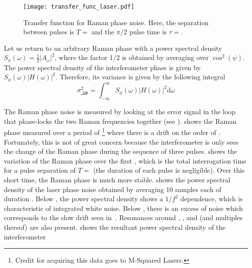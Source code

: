 \begin{figure}[htpb!]
  \centering
  \texttt{[image: transfer\_func\_laser.pdf]}
  \caption[Transfer function for Raman phase noise.]{Transfer function
  for Raman phase noise. Here, the separation between pulses is \(T =
  \) and the \(\pi/2\) pulse time is \(\tau
=\).}
  \label{fig:transfer_function}
\end{figure}
\par\noindent
Let us return to an arbitrary Raman phase with a power spectral density
$S_\phi(\omega) = \frac{1}{2}|A_\omega|^2$, where the factor 1/2 is
obtained by averaging over $\cos^2(\psi)$. The power spectral density of the interferometer
phase is given by $S_\phi(\omega) |H(\omega)|^2$. Therefore, its
variance is given by the following integral
\begin{equation}
  \sigma_{\Delta\Phi}^2 = \int_{-\infty}^\infty
    S_\phi(\omega)|H(\omega)|^2 \mathrm{d}\omega 
  \end{equation}
 \par\noindent
The Raman phase noise is measured by looking at the error signal in
the loop that
phase-locks the two Raman frequencies together (see
). 
shows the Raman phase measured over a period of
\footnote{Credit for
acquiring this data goes to M-Squared Lasers.} where there is a drift
on the order of . 
Fortunately, this is not of great concern because the interferometer
is only sees the change of the Raman phase during the sequence of
three pulses.  shows the
variation of the Raman phase over the first , which
is the total interrogation time for a pulse separation of $T = $
 (the duration of each pulse is
negligible). Over this short time, the Raman phase
is much more stable.  shows the power
spectral density of the laser phase noise obtained by averaging 10
samples each of duration . Below , the
power spectral density shows a $1/f^2$ dependence, which is
characteristic of integrated white noise. Below ,
there is an excess of noise which corresponds to the slow drift seen
in~. Resonances around
, ,  and
 (and multiples thereof) are also present.
 shows the resultant power spectral density of the interferometer
